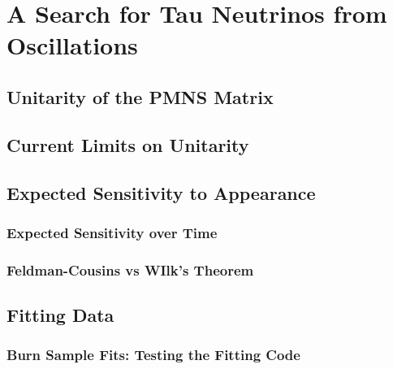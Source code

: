 \chapter{A Search for Tau Neutrinos from Oscillations}

\label{sec:unitarity}
\section{Unitarity of the PMNS Matrix}

\label{sec:current_limits}
\section{Current Limits on Unitarity}

\label{sec:mc_expectation}


\label{sec:tau_parametrization}


\label{sec:systematics}


\label{sec:likelihood}


\label{sec:sensitivity}
\section{Expected Sensitivity to Appearance}

\label{subsec:sensitivity_vs_time}
\subsection{Expected Sensitivity over Time}

\label{subsec:wilks}
\subsection{Feldman-Cousins vs WIlk's Theorem}

\label{sec:fitting_data}
\section{Fitting Data}

\label{subsec:burn_sample}
\subsection{Burn Sample Fits: Testing the Fitting Code}

